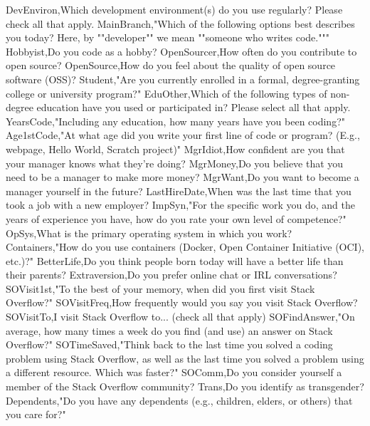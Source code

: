 \documentclass{dyplom}
\begin{document}
DevEnviron,Which development environment(s) do you use regularly?  Please check all that apply.
MainBranch,"Which of the following options best describes you today? Here, by ""developer"" we mean ""someone who writes code."""
Hobbyist,Do you code as a hobby?
OpenSourcer,How often do you contribute to open source?
OpenSource,How do you feel about the quality of open source software (OSS)?
Student,"Are you currently enrolled in a formal, degree-granting college or university program?"
EduOther,Which of the following types of non-degree education have you used or participated in? Please select all that apply.
YearsCode,"Including any education, how many years have you been coding?"
Age1stCode,"At what age did you write your first line of code or program? (E.g., webpage, Hello World, Scratch project)"
MgrIdiot,How confident are you that your manager knows what they’re doing?
MgrMoney,Do you believe that you need to be a manager to make more money?
MgrWant,Do you want to become a manager yourself in the future?
LastHireDate,When was the last time that you took a job with a new employer?
ImpSyn,"For the specific work you do, and the years of experience you have, how do you rate your own level of competence?"
OpSys,What is the primary operating system in which you work?
Containers,"How do you use containers (Docker, Open Container Initiative (OCI), etc.)?"
BetterLife,Do you think people born today will have a better life than their parents?
Extraversion,Do you prefer online chat or IRL conversations?
SOVisit1st,"To the best of your memory, when did you first visit Stack Overflow?"
SOVisitFreq,How frequently would you say you visit Stack Overflow?
SOVisitTo,I visit Stack Overflow to... (check all that apply)
SOFindAnswer,"On average, how many times a week do you find (and use) an answer on Stack Overflow?"
SOTimeSaved,"Think back to the last time you solved a coding problem using Stack Overflow, as well as the last time you solved a problem using a different resource. Which was faster?"
SOComm,Do you consider yourself a member of the Stack Overflow community?
Trans,Do you identify as transgender?
Dependents,"Do you have any dependents (e.g., children, elders, or others) that you care for?"
\end{document}
